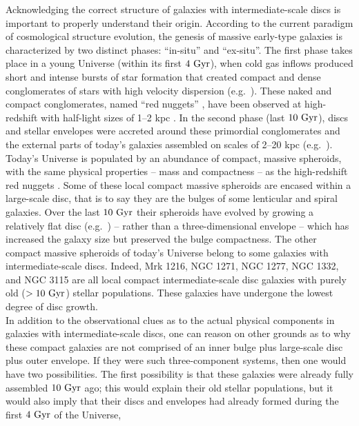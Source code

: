 \documentclass[useAMS,usenatbib,article]{mnras}
\begin{document}
Acknowledging the correct structure of galaxies with intermediate-scale discs is important to properly understand their origin. 
According to the current paradigm of cosmological structure evolution, 
the genesis of massive early-type galaxies is characterized by two distinct phases: ``in-situ'' and ``ex-situ''. 
The first phase takes place in a young Universe (within its first $4~\rm Gyr$), 
when cold gas inflows produced short and intense bursts of star formation 
that created compact and dense conglomerates of stars with high velocity dispersion (e.g.~\citealt{prieto2013}). 
These naked and compact conglomerates, named ``red nuggets'' \citep{damjanov2009}, 
have been observed at high-redshift with half-light sizes of 1--2 kpc \citep{daddi2005,trujillo2006,vandokkum2008}.
In the second phase (last $10~\rm Gyr$), discs and stellar envelopes 
were accreted around these primordial conglomerates and the external parts of today's galaxies assembled on scales of 2--20 kpc 
(e.g.~\citealt{driver2013}). \\
Today's Universe is populated by an abundance of compact, massive spheroids, 
with the same physical properties -- mass and compactness -- as the high-redshift red nuggets \citep{graham2013review,GDS2015}. 
Some of these local compact massive spheroids are encased within a large-scale disc, 
that is to say they are the bulges of some lenticular and spiral galaxies.  
Over the last $10~\rm Gyr$ their spheroids have evolved by growing a relatively flat disc (e.g.~\citealt{pichon2011,danovich2012,stewart2013})
-- rather than a three-dimensional envelope -- 
which has increased the galaxy size but preserved the bulge compactness. 
The other compact massive spheroids of today's Universe belong to some galaxies with intermediate-scale discs. 
Indeed, Mrk 1216, NGC 1271, NGC 1277, NGC 1332, and NGC 3115 are all local compact intermediate-scale disc galaxies 
with purely old ($>10~\rm Gyr$) stellar populations. 
These galaxies have undergone the lowest degree of disc growth. \\
In addition to the observational clues as to the actual physical components in galaxies with intermediate-scale discs, 
one can reason on other grounds as to why these compact galaxies are not comprised of an inner bulge 
plus large-scale disc plus outer envelope. 
If they were such three-component systems, then one would have two possibilities. 
The first possibility is that these galaxies were already fully assembled $10~\rm Gyr$ ago; 
this would explain their old stellar populations, 
but it would also imply that their discs and envelopes had already formed during the first $4~\rm Gyr$ of the Universe, 
\end{document}
